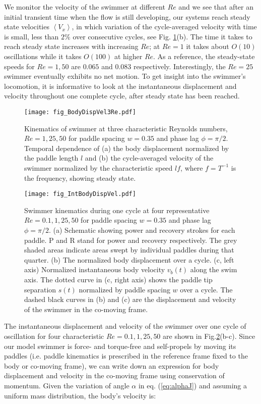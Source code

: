 \documentclass[%
 onecolumn,
superscriptaddress,
 amsmath,amssymb,
 aps,
longbibliography
]{revtex4-2}
\begin{document}
We monitor the velocity of the swimmer at different $Re$ and we see that after an initial transient time when the flow is still developing, our systems reach steady state velocities $\left< V_x \right>$, in which variation of the cycle-averaged velocity with time is small, less than $2\%$ over consecutive cycles, see Fig. \ref{fig:KinematicsThreeRe}(b). The time it takes to reach steady state increases with increasing $Re$; at $Re = 1$ it takes about $O(10)$ oscillations while it takes $O(100)$ at higher $Re$. As a reference, the steady-state speeds for $Re = 1, 50$ are $0.065$ and $0.083 $ respectively. Interestingly, the $Re = 25$ swimmer eventually exhibits no net motion. To get insight into the swimmer's locomotion, it is informative to look at the instantaneous displacement and velocity throughout one complete cycle, after steady state has been reached.


\begin{figure}
\texttt{[image: fig\_BodyDispVel3Re.pdf]}
\caption{Kinematics of swimmer at three characteristic Reynolds numbers, $Re=1,25,50$ for paddle spacing $w = 0.35$ and phase lag $\phi = \pi / 2$. Temporal dependence of (a) the body displacement normalized by the paddle length $l$ and (b) the cycle-averaged velocity of the swimmer normalized by the characteristic speed $l f $, where $f = T^{-1}$ is the frequency, showing steady state.}
\label{fig:KinematicsThreeRe}
\end{figure}


\begin{figure}
\texttt{[image: fig\_IntBodyDispVel.pdf]}
\caption{Swimmer kinematics during one cycle at four representative $Re=0.1, 1, 25, 50$ for paddle spacing $w = 0.35$ and phase lag $\phi = \pi / 2$. (a) Schematic showing power and recovery strokes for each paddle. P and R stand for power and recovery respectively. The grey shaded areas indicate areas swept by individual paddles during that quarter. 
(b) The normalized body displacement over a cycle. 
(c, left axis) Normalized instantaneous body velocity $v_b(t)$ along the swim axis. The dotted curve in (c, right axis) shows the paddle tip separation $s(t)$ normalized by paddle spacing $w$ over a cycle. 
The dashed black curves in (b) and (c) are the displacement and velocity of the swimmer in the co-moving frame.
}
\label{fig:KinematicsCompleteCycle}
\end{figure}

The instantaneous displacement and velocity of the swimmer over one cycle of oscillation for four characteristic $Re=0.1,1,25,50$ are shown in Fig.\ref{fig:KinematicsCompleteCycle}(b-c). 
Since our model swimmer is  force- and torque-free and self-propels by moving its paddles (i.e. paddle kinematics is prescribed in the reference frame fixed to the body or co-moving frame), we can write down an expression for body displacement and velocity in the co-moving frame using conservation of momentum. Given the variation of angle $\alpha$ in eq. (\ref{eq:alphaJ}) and assuming a uniform mass distribution,  the body's velocity is: 
\end{document}
